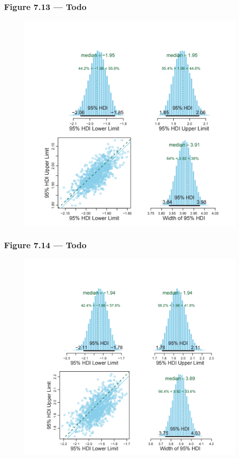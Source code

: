 \documentclass[usenames,dvipsnames,table]{beamer}
\begin{document}
\begin{frame}
\frametitle{Figure 7.13 --- Todo}
\begin{figure}
\centering
\includegraphics[height=0.8\textheight]{img/fig7_13}
\end{figure}
\end{frame}

\begin{frame}
\frametitle{Figure 7.14 --- Todo}
\begin{figure}
\centering
\includegraphics[height=0.8\textheight]{img/fig7_14}
\end{figure}
\end{frame}

\end{document}
